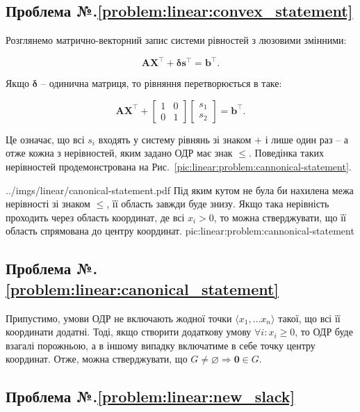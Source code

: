 \documentclass[\main/book.tex]{subfiles}
\begin{document}
\subsection*{Проблема №.\ref{problem:linear:convex_statement}}

Розглянемо матрично-векторний запис системи рівностей з люзовими змінними:

\[
 \mathbf{A} \mathbf{X}^\top + \mathbf{\delta} \mathbf{s}^\top = \mathbf{b}^\top\text{.}
\]

Якщо $\mathbf{\delta}$ -- одинична матриця, то рівняння перетворюється в таке:


\[
 \mathbf{A} \mathbf{X}^\top +
 \left[
  \begin{array}{cc}
   1 & 0 \\
   0 & 1
  \end{array}
 \right]
 \left[
  \begin{array}{c}
   s_1 \\
   s_2
  \end{array}
 \right] = \mathbf{b}^\top\text{.}
\]

Це означає, що всі $s_i$ входять у систему рівнянь зі знаком \flqq{}$+$\frqq{} і лише один раз -- а отже кожна з нерівностей, яким задано ОДР має знак \flqq{}$\leq$\frqq{}. Поведінка таких нерівностей продемонстрована на Рис.~\ref{pic:linear:problem:cannonical-statement}.

\illustration
 {../imgs/linear/canonical-statement.pdf}
 {Під яким кутом не була би нахилена межа нерівності зі знаком \flqq{}$\leq$\frqq{}, її область завжди буде знизу. Якщо така нерівність проходить через область координат, де всі $x_i > 0$, то можна стверджувати, що її область спрямована до центру координат.}
 {pic:linear:problem:cannonical-statement}

\subsection*{Проблема №.\ref{problem:linear:canonical_statement}}

Припустимо, умови ОДР не включають жодної точки $\langle x_1, \ldots x_n \rangle$ такої, що всі її координати додатні. Тоді, якщо створити додаткову умову $\forall i: x_i \geq 0$, то ОДР буде взагалі порожньою, а в іншому випадку включатиме в себе точку центру координат. Отже, можна стверджувати, що $G \neq \varnothing \Rightarrow \mathbf{0} \in G$.

\subsection*{Проблема №.\ref{problem:linear:new_slack}}
\end{document}
